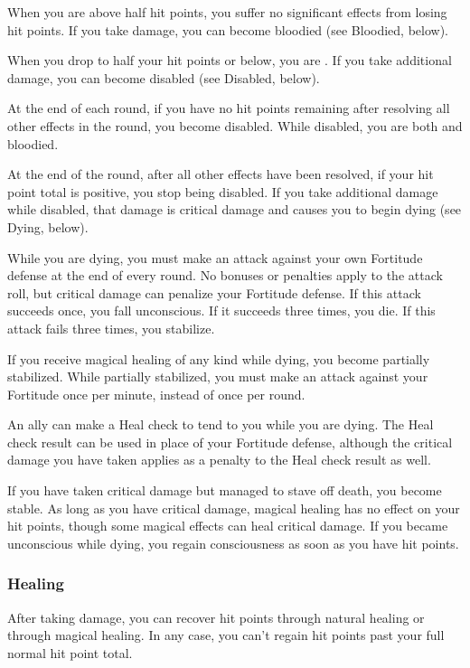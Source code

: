  When you are above half hit points, you suffer no significant effects from losing hit points.
If you take damage, you can become bloodied (see Bloodied, below).

 When you drop to half your hit points or below, you are \bloodied.
If you take additional damage, you can become disabled (see Disabled, below).

\label{Disabled} At the end of each round, if you have no hit points remaining after resolving all other effects in the round, you become disabled.
While disabled, you are both \staggered and bloodied.

At the end of the round, after all other effects have been resolved, if your hit point total is positive, you stop being disabled.
If you take additional damage while disabled, that damage is critical damage and causes you to begin dying (see Dying, below).

\label{Dying} While you are dying, you must make an attack against your own Fortitude defense at the end of every round.
No bonuses or penalties apply to the attack roll, but critical damage can penalize your Fortitude defense.
If this attack succeeds once, you fall unconscious.
If it succeeds three times, you die.
If this attack fails three times, you stabilize.

If you receive magical healing of any kind while dying, you become partially stabilized.
While partially stabilized, you must make an attack against your Fortitude once per minute, instead of once per round.

An ally can make a Heal check to tend to you while you are dying.
The Heal check result can be used in place of your Fortitude defense, although the critical damage you have taken applies as a penalty to the Heal check result as well.

\label{Stable}
If you have taken critical damage but managed to stave off death, you become stable.
As long as you have critical damage, magical healing has no effect on your hit points, though some magical effects can heal critical damage.
If you became unconscious while dying, you regain consciousness as soon as you have hit points.

\subsubsection{Healing}
After taking damage, you can recover hit points through natural healing or through magical healing.
In any case, you can't regain hit points past your full normal hit point total.

